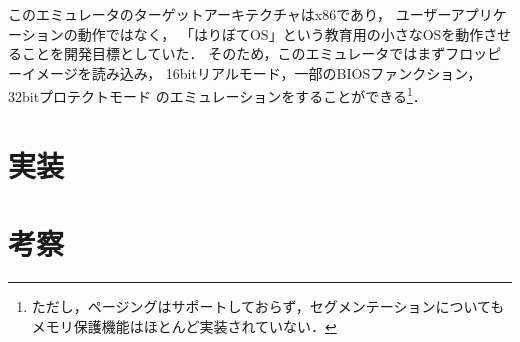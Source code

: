 \documentclass[a4j,10pt]{jsarticle}
\begin{document}
このエミュレータのターゲットアーキテクチャはx86であり，
ユーザーアプリケーションの動作ではなく，
「はりぼてOS」という教育用の小さなOSを動作させることを開発目標としていた．
そのため，このエミュレータではまずフロッピーイメージを読み込み，
16bitリアルモード，一部のBIOSファンクション，32bitプロテクトモード
のエミュレーションをすることができる\footnote{ただし，ページングはサポートしておらず，セグメンテーションについてもメモリ保護機能はほとんど実装されていない．}．

\section{実装}

\section{考察}



\end{document}
